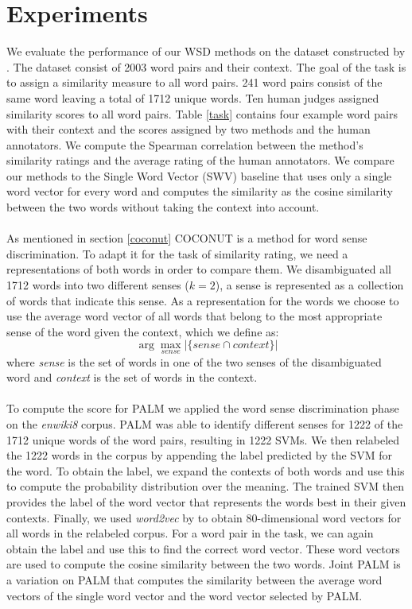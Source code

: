 \documentclass[11pt]{article}
\begin{document}
\section{Experiments}
We evaluate the performance of our WSD methods on the dataset constructed by \cite{global}. The dataset consist of 2003 word pairs and their context. The goal of the task is to assign a similarity measure to all word pairs. 241 word pairs consist of the same word leaving a total of 1712 unique words. Ten human judges assigned similarity scores to all word pairs. Table \ref{task} contains four example word pairs with their context and the scores assigned by two methods and the human annotators. We compute the Spearman correlation between the method's similarity ratings and the average rating of the human annotators. We compare our methods to the Single Word Vector (SWV) baseline that uses only a single word vector for every word and computes the similarity as the cosine similarity between the two words without taking the context into account. \\\\
As mentioned in section \ref{coconut} COCONUT is a method for word sense discrimination. To adapt it for the task of similarity rating, we need a representations of both words in order to compare them. We disambiguated all 1712 words into two different senses ($k = 2$), a sense is represented as a collection of words that indicate this sense. As a representation for the words we choose to use the average word vector of all words that belong to the most appropriate sense of the word given the context, which we define as:
\begin{equation}\label{sense} \arg\max_{\textit{sense}}  | \{\textit{sense} \cap \textit{context}\} |\end{equation}
where \textit{sense} is the set of words in one of the two senses of the disambiguated word and \textit{context} is the set of words in the context.\\\\
To compute the score for PALM we applied the word sense discrimination phase on the \textit{enwiki8} corpus. PALM was able to identify different senses for 1222 of the 1712 unique words of the word pairs, resulting in 1222 SVMs. We then relabeled the 1222 words in the corpus by appending the label predicted by the SVM for the word. To obtain the label, we expand the contexts of both words and use this to compute the probability distribution over the meaning. The trained SVM then provides the label of the word vector that represents the words best in their given contexts. Finally, we used \textit{word2vec} by \cite{word2vec} to obtain 80-dimensional word vectors for all words in the relabeled corpus. For a word pair in the task, we can again obtain the label and use this to find the correct word vector. These word vectors are used to compute the cosine similarity between the two words. Joint PALM is a variation on PALM that computes the similarity between the average word vectors of the single word vector and the word vector selected by PALM.
\end{document}
